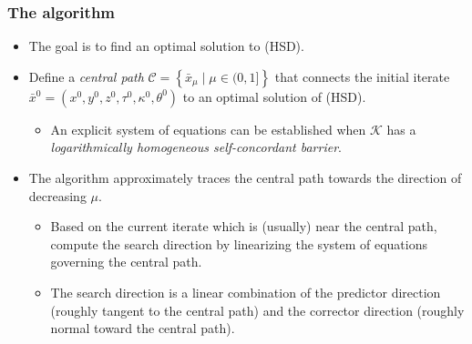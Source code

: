 \documentclass{beamer}
\begin{document}
\begin{frame}
	\frametitle{The algorithm}
	\begin{itemize}
		\item The goal is to find an optimal solution to (HSD).
		\item Define a \textit{central path} $\mathcal{C} = \left\{\bar x_\mu \mid \mu \in (0,1] \right\}$ that connects the initial iterate $\bar x^0 = \left(x^0,y^0,z^0,\tau^0,\kappa^0,\theta^0\right)$ to an optimal solution of (HSD).
		\begin{itemize}
		\item An explicit system of equations can be established when $\mathcal{K}$ has a \textit{logarithmically homogeneous self-concordant barrier}.
		\end{itemize}
		\item The algorithm approximately traces the central path towards the direction of decreasing $\mu$.
				\begin{itemize}
					\item Based on the current iterate which is (usually) near the central path, compute the search direction by linearizing the system of equations governing the central path.
					\item The search direction is a linear combination of the predictor direction (roughly tangent to the central path) and the corrector direction (roughly normal toward the central path).
				\end{itemize}
	\end{itemize}
\end{frame}
\end{document}
